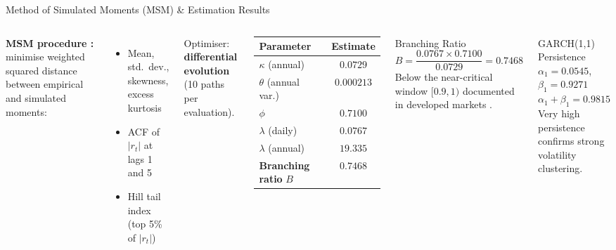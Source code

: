 \documentclass[10pt, aspectratio=169]{beamer}
\begin{document}
\begin{frame}{Method of Simulated Moments (MSM) \& Estimation Results}
\begin{columns}[T]
  \textbf{MSM procedure \cite{kluppelberg2004continuous}:} minimise
  weighted squared distance between empirical and simulated moments:
  \begin{itemize}\small
    \item Mean, std.\ dev., skewness, excess kurtosis
    \item ACF of $|r_t|$ at lags 1 and 5
    \item Hill tail index (top 5\% of $|r_t|$)
  \end{itemize}
  Optimiser: \textbf{differential evolution}
  (10 paths per evaluation).

  \medskip
  {\small\begin{tabular}{l c}
    \toprule
    Parameter & Estimate \\
    \midrule
    $\kappa$ (annual) & $0.0729$ \\
    $\theta$ (annual var.) & $0.000213$ \\
    $\phi$ & $0.7100$ \\
    $\lambda$ (daily) & $0.0767$ \\
    $\lambda$ (annual) & $19.335$ \\
    \midrule
    \textbf{Branching ratio} $B$ & $\mathbf{0.7468}$ \\
    \bottomrule
  \end{tabular}}
  \begin{alertblock}{Branching Ratio}
    \[
      B = \frac{0.0767 \times 0.7100}{0.0729} = 0.7468
    \]
    Below the near-critical window $[0.9,1)$ documented in
    developed markets \cite{hardiman2013critical}.
  \end{alertblock}
  \vspace{0.3cm}
  \begin{block}{GARCH(1,1) Persistence}
    $\alpha_1 = 0.0545$,\quad $\beta_1 = 0.9271$\\
    $\alpha_1 + \beta_1 = \mathbf{0.9815}$\\[4pt]
    Very high persistence confirms strong volatility clustering.
  \end{block}
\end{columns}
\end{frame}

\end{document}
